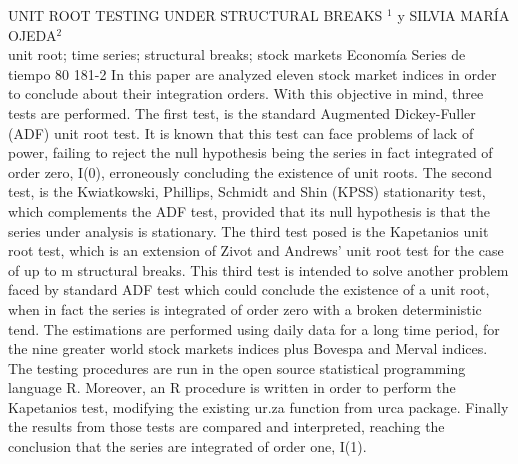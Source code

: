 \A
{UNIT ROOT TESTING UNDER STRUCTURAL BREAKS}
{$^1$ y SILVIA MARÍA OJEDA$^2$}
{
\\}
{unit root; time series; structural breaks; stock markets} 
 {Economía} 
 {Series de tiempo} 
 {80} 
 {181-2}
{In this paper are analyzed eleven stock market indices in order to conclude about their integration orders. With this objective in mind, three tests are performed. The first test, is the standard Augmented Dickey-Fuller (ADF) unit root test. It is known that this test can face problems of lack of power, failing to reject the null hypothesis being the series in fact integrated of order zero, I(0), erroneously concluding the existence of unit roots. The second test, is the Kwiatkowski, Phillips, Schmidt and Shin (KPSS) stationarity test, which complements the ADF test, provided that its null hypothesis is that the series under analysis is stationary. The third test posed is the Kapetanios unit root test, which is an extension of Zivot and Andrews’ unit root test for the case of up to m structural breaks. This third test is intended to solve another problem faced by standard ADF test which could conclude the existence of a unit root, when in fact the series is integrated of order zero with a broken deterministic tend. The estimations are performed using daily data for a long time period, for the nine greater world stock markets indices plus Bovespa and Merval indices. The testing procedures are run in the open source statistical programming language R. Moreover, an R procedure is written in order to perform the Kapetanios test, modifying the existing ur.za function from urca package. Finally the results from those tests are compared and interpreted, reaching the conclusion that the series are integrated of order one, I(1).}
